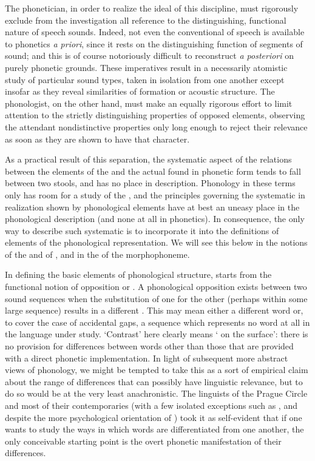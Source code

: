 The phonetician, in order to realize the ideal of this discipline,
must rigorously exclude from the investigation all reference to the
distinguishing, functional nature of speech sounds. Indeed, not even
the conventional  of speech is available to phonetics
\emph{a priori}, since it rests on the distinguishing function of
segments of sound; and this is of course notoriously difficult to
reconstruct \emph{a posteriori} on purely phonetic grounds. These
imperatives result in a necessarily atomistic study of particular
sound types, taken in isolation from one another except insofar as
they reveal similarities of formation or acoustic structure. The
phonologist, on the other hand, must make an equally rigorous effort
to limit attention to the strictly distinguishing properties of
opposed elements, observing the attendant nondistinctive properties
only long enough to reject their relevance as soon as they are shown
to have that character.

As a practical result of this separation, the systematic aspect of the
relations between the  elements of the 
and the actual  found in phonetic form tends to fall between
two stools, and has no place in description. Phonology in these terms
only has room for a study of the  , and the
principles governing the systematic  in realization shown by
phonological elements have at best an uneasy place in the phonological
description (and none at all in phonetics). In consequence, the only
way to describe such systematic  is to incorporate it into
the definitions of elements of the phonological representation. We
will see this below in the notions of the  and of
, and in the  of the morphophoneme.

In defining the basic elements of phonological structure, {\Trubetzkoy}
starts from the functional notion of opposition or . A
phonological opposition exists between two sound sequences when the
substitution of one for the other (perhaps within some large sequence)
results in a different . This may mean either a different word
or, to cover the case of accidental gaps, a sequence which represents
no word at all in the language under study. `Contrast' here clearly
means ` on the surface': there is no provision for differences
between words other than those that are provided with a direct
phonetic implementation. In light of subsequent more abstract views of
phonology, we might be tempted to take this as a sort of empirical
claim about the range of differences that can possibly have linguistic
relevance, but to do so would be at the very least anachronistic. The
linguists of the Prague Circle and most of their contemporaries (with
a few isolated exceptions such as {\Sapir}, and despite the more
psychological orientation of {\DeCourtenay}) took it as
self-evident that if one wants to study the ways in which words are
differentiated from one another, the only conceivable starting point
is the overt phonetic manifestation of their differences.

